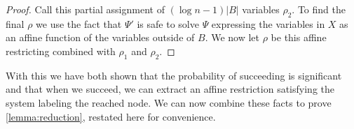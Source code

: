 {\begin{proof}
    Call this partial assignment of $({\log n}-1)|B|$ variables $\rho_2$. To find the final $\rho$ we use the fact that $\Psi'$ is safe to solve $\Psi$ expressing the variables in $X$ as an affine function of the variables outside of $B$. We now let $\rho$ be this affine restricting combined with $\rho_1$ and $\rho_2$. 
\end{proof}
}


With this we have both shown that the probability of succeeding is significant and that when we succeed, we can extract an affine restriction satisfying the system labeling the reached node. We can now combine these facts to 
{prove \autoref{lemma:reduction}, restated here for convenience.}


